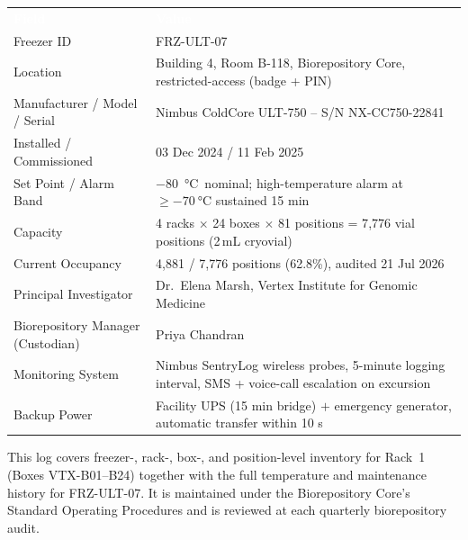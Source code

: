 \begin{center}
\renewcommand{\arraystretch}{1.35}
\begin{tabularx}{0.92\linewidth}{@{}l X@{}}
\rowcolor{freezerblue}
\textcolor{white}{\textbf{Field}} & \textcolor{white}{\textbf{Value}} \\
Freezer ID & FRZ-ULT-07 \\
Location & Building 4, Room B-118, Biorepository Core, restricted-access (badge + PIN) \\
Manufacturer / Model / Serial & Nimbus ColdCore ULT-750 -- S/N NX-CC750-22841 \\
Installed / Commissioned & 03 Dec 2024 / 11 Feb 2025 \\
Set Point / Alarm Band & \SI{-80}{\celsius}\ nominal; high-temperature alarm at $\geq\SI{-70}{\celsius}$ sustained 15 min \\
Capacity & 4 racks $\times$ 24 boxes $\times$ 81 positions = 7{,}776 vial positions (2\,mL cryovial) \\
Current Occupancy & 4{,}881 / 7{,}776 positions (62.8\%), audited 21 Jul 2026 \\
Principal Investigator & Dr.\ Elena Marsh, Vertex Institute for Genomic Medicine \\
Biorepository Manager (Custodian) & Priya Chandran \\
Monitoring System & Nimbus SentryLog wireless probes, 5-minute logging interval, SMS + voice-call escalation on excursion \\
Backup Power & Facility UPS (15 min bridge) $+$ emergency generator, automatic transfer within 10 s \\
\end{tabularx}
\end{center}

\vspace{0.4em}
\noindent
{} This log covers freezer-, rack-, box-, and position-level inventory for
Rack~1 (Boxes VTX-B01--B24) together with the full temperature and maintenance history for
FRZ-ULT-07. It is maintained under the Biorepository Core's Standard Operating Procedures
\citep{isber2023,nih2016} and is reviewed at each quarterly biorepository audit.
